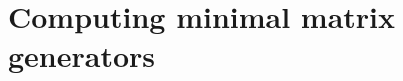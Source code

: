 \documentclass[12pt]{article}
\newcommand{\storeArg}{} %
\renewcommand{\ge}{\geqslant} %
\renewcommand{\le}{\leqslant} %
\newcommand{\NN}{\mathbb{Z}_{\ge 0}} %
\newcommand{\var}{X} %
\newcommand{\field}{\mathbb{K}} %
\newcommand{\polRing}{\field[\var]} %
\newcommand{\Pox}{[\mkern-3mu[ \var ]\mkern-3.2mu]}
\newcommand{\psRing}{\field\Pox}
\newcommand{\matSpace}[1][\rdim]{\renewcommand\storeArg{#1}\matSpaceAux} %
\newcommand{\matSpaceAux}[1][\storeArg]{\field^{\storeArg \times #1}} %
\newcommand{\polMatSpace}[1][\rdim]{\renewcommand\storeArg{#1}\polMatSpaceAux} %
\newcommand{\polMatSpaceAux}[1][\storeArg]{\polRing^{\storeArg \times #1}} %
\newcommand{\psMatSpace}[1][\rdim]{\renewcommand\storeArg{#1}\psMatSpaceAux} %
\newcommand{\psMatSpaceAux}[1][\storeArg]{\psRing^{\storeArg \times #1}} %
\newcommand{\mat}[1]{\mathbf{\MakeUppercase{#1}}} %
\newcommand{\col}[1]{\mathbf{\MakeLowercase{#1}}} %
\newcommand{\rdim}{m} %
\newcommand{\cdim}{n} %
\newcommand{\seqelt}[1]{S_{#1}} %
\newcommand{\seq}{\mathcal{S}} %
\newcommand{\seqpm}{\mat{S}} %
\newcommand{\rel}{\col{p}} %
\newcommand{\relSpace}{\polMatSpace[1][\rdim]} %
\begin{document}
%
%
%

\section{Computing minimal matrix generators}
\label{sec:computing_matrix_generators}
\end{document}
